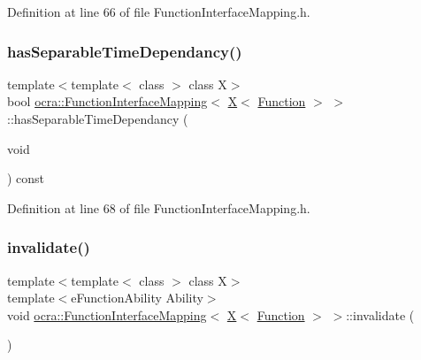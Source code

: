 Definition at line 66 of file Function\+Interface\+Mapping.\+h.

\hypertarget{structocra_1_1FunctionInterfaceMapping_3_01X_3_01Function_01_4_01_4_a42c4de44a91e30e07db6934ed81ead09}{}\label{structocra_1_1FunctionInterfaceMapping_3_01X_3_01Function_01_4_01_4_a42c4de44a91e30e07db6934ed81ead09} 
\subsubsection{\texorpdfstring{has\+Separable\+Time\+Dependancy()}{hasSeparableTimeDependancy()}}
{\footnotesize\ttfamily template$<$template$<$ class $>$ class X$>$ \\
bool \hyperlink{structocra_1_1FunctionInterfaceMapping}{ocra\+::\+Function\+Interface\+Mapping}$<$ \hyperlink{namespaceocra_a436781c7059a0f76027df1c652126260a53f3cfeeb322946db40cd86dfebfb237}{X}$<$ \hyperlink{classocra_1_1Function}{Function} $>$ $>$\+::has\+Separable\+Time\+Dependancy (\begin{DoxyParamCaption}\item[{void}]{ }\end{DoxyParamCaption}) const\hspace{0.3cm}{\ttfamily [inline]}}



Definition at line 68 of file Function\+Interface\+Mapping.\+h.

\hypertarget{structocra_1_1FunctionInterfaceMapping_3_01X_3_01Function_01_4_01_4_ac4e31f7faf096831c52691ef361054b1}{}\label{structocra_1_1FunctionInterfaceMapping_3_01X_3_01Function_01_4_01_4_ac4e31f7faf096831c52691ef361054b1} 
\subsubsection{\texorpdfstring{invalidate()}{invalidate()}}
{\footnotesize\ttfamily template$<$template$<$ class $>$ class X$>$ \\
template$<$e\+Function\+Ability Ability$>$ \\
void \hyperlink{structocra_1_1FunctionInterfaceMapping}{ocra\+::\+Function\+Interface\+Mapping}$<$ \hyperlink{namespaceocra_a436781c7059a0f76027df1c652126260a53f3cfeeb322946db40cd86dfebfb237}{X}$<$ \hyperlink{classocra_1_1Function}{Function} $>$ $>$\+::invalidate (\begin{DoxyParamCaption}{ }\end{DoxyParamCaption})\hspace{0.3cm}{\ttfamily [inline]}}



